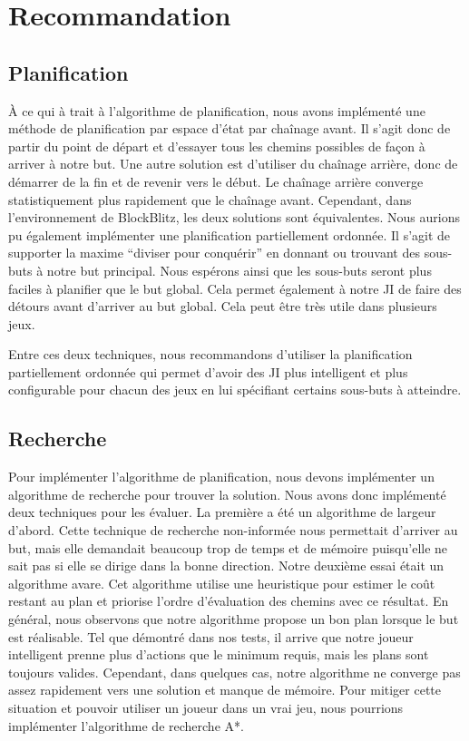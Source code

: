 \documentclass[12pt,letterpaper]{article}
\begin{document}
\section{Recommandation} %

\subsection{Planification}
À ce qui à trait à l'algorithme de planification, nous avons implémenté une méthode de planification par espace d'état par chaînage avant. Il s'agit donc de partir du point de départ et d'essayer tous les chemins possibles de façon à arriver à notre but. Une autre solution est d'utiliser du chaînage arrière, donc de démarrer de la fin et de revenir vers le début. Le chaînage arrière converge statistiquement plus rapidement que le chaînage avant. Cependant, dans l'environnement de BlockBlitz, les deux solutions sont équivalentes. Nous aurions pu également implémenter une planification partiellement ordonnée. Il s'agit de supporter la maxime ``diviser pour conquérir'' en donnant ou trouvant des sous-buts à notre but principal. Nous espérons ainsi que les sous-buts seront plus faciles à planifier que le but global. Cela permet également à notre JI de faire des détours avant d'arriver au but global. Cela peut être très utile dans plusieurs jeux.

Entre ces deux techniques, nous recommandons d'utiliser la planification partiellement ordonnée qui permet d'avoir des JI plus intelligent et plus configurable pour chacun des jeux en lui spécifiant certains sous-buts à atteindre.

\subsection{Recherche}
Pour implémenter l'algorithme de planification, nous devons implémenter un algorithme de recherche pour trouver la solution. Nous avons donc implémenté deux techniques pour les évaluer. La première a été un algorithme de largeur d'abord. Cette technique de recherche non-informée nous permettait d'arriver au but, mais elle demandait beaucoup trop de temps et de mémoire puisqu'elle ne sait pas si elle se dirige dans la bonne direction. Notre deuxième essai était un algorithme avare. Cet algorithme utilise une heuristique pour estimer le coût restant au plan et priorise l'ordre d'évaluation des chemins avec ce résultat. En général, nous observons que notre algorithme propose un bon plan lorsque le but est réalisable. Tel que démontré dans nos tests, il arrive que notre joueur intelligent prenne plus d'actions que le minimum requis, mais les plans sont toujours valides. Cependant, dans quelques cas, notre algorithme ne converge pas assez rapidement vers une solution et manque de mémoire. Pour mitiger cette situation et pouvoir utiliser un joueur dans un vrai jeu, nous pourrions implémenter l'algorithme de recherche A*.
\end{document}
